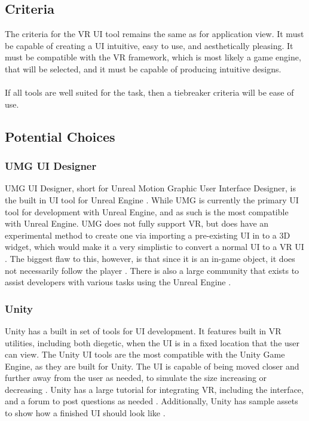 \documentclass[onecolumn, draftclsnofoot,10pt, compsoc]{IEEEtran}
\begin{document}
\subsection{Criteria}
The criteria for the VR UI tool remains the same as for application view. It must be capable of creating a UI intuitive, easy to use, and aesthetically pleasing. It must be compatible with the VR framework, which is most likely a game engine, that will be selected, and it must be capable of producing intuitive designs.
\\
\\
If all tools are well suited for the task, then a tiebreaker criteria will be ease of use.
\subsection{Potential Choices}
\subsubsection{UMG UI Designer}
UMG UI Designer, short for Unreal Motion Graphic User Interface Designer, is the built in UI tool for Unreal Engine \cite{2}. While UMG is currently the primary UI tool for development with Unreal Engine, and as such is the most compatible with Unreal Engine. UMG does not fully support VR, but does have an experimental method to create one via importing a pre-existing UI in to a 3D widget, which would make it a very simplistic to convert a normal UI to a VR UI \cite{8}. The biggest flaw to this, however, is that since it is an in-game object, it does not necessarily follow the player \cite{8}. There is also a large community that exists to assist developers with various tasks using the Unreal Engine \cite{2}.

\subsubsection{Unity}
Unity has a built in set of tools for UI development. It features built in VR utilities, including both diegetic, when the UI is in a fixed location that the user can view. The Unity UI tools are the most compatible with the Unity Game Engine, as they are built for Unity. The UI is capable of being moved closer and further away from the user as needed, to simulate the size increasing or decreasing \cite{9}. Unity has a large tutorial for integrating VR, including the interface, and a forum to post questions as needed \cite{9}. Additionally, Unity has sample assets to show how a finished UI should look like \cite{9}. 
\end{document}
